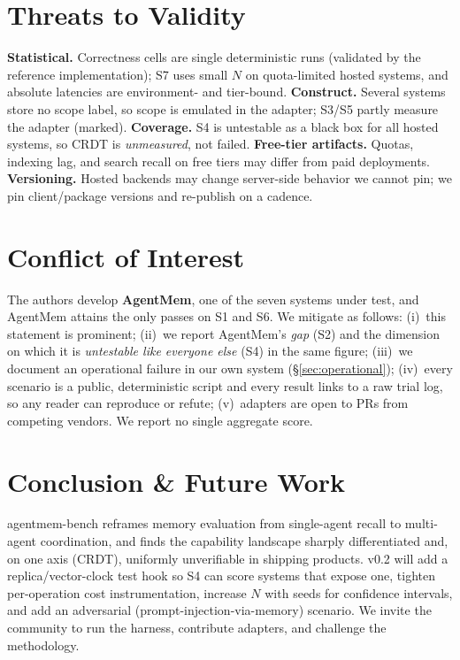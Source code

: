 \documentclass[11pt]{article}
\begin{document}
\section{Threats to Validity}
\textbf{Statistical.} Correctness cells are single deterministic runs (validated by
the reference implementation); S7 uses small $N$ on quota-limited hosted systems, and
absolute latencies are environment- and tier-bound. \textbf{Construct.} Several
systems store no scope label, so scope is emulated in the adapter; S3/S5 partly
measure the adapter (marked). \textbf{Coverage.} S4 is untestable as a black box for
all hosted systems, so CRDT is \emph{unmeasured}, not failed. \textbf{Free-tier
artifacts.} Quotas, indexing lag, and search recall on free tiers may differ from paid
deployments. \textbf{Versioning.} Hosted backends may change server-side behavior we
cannot pin; we pin client/package versions and re-publish on a cadence.

\section{Conflict of Interest}\label{sec:coi}
The authors develop \textbf{AgentMem}, one of the seven systems under test, and
AgentMem attains the only passes on S1 and S6. We mitigate as follows: (i)~this
statement is prominent; (ii)~we report AgentMem's \emph{gap} (S2) and the dimension on
which it is \emph{untestable like everyone else} (S4) in the same figure; (iii)~we
document an operational failure in our own system (\S\ref{sec:operational}); (iv)~every
scenario is a public, deterministic script and every result links to a raw trial log,
so any reader can reproduce or refute; (v)~adapters are open to PRs from competing
vendors. We report no single aggregate score.

\section{Conclusion \& Future Work}
agentmem-bench reframes memory evaluation from single-agent recall to multi-agent
coordination, and finds the capability landscape sharply differentiated and, on one
axis (CRDT), uniformly unverifiable in shipping products. v0.2 will add a
replica/vector-clock test hook so S4 can score systems that expose one, tighten
per-operation cost instrumentation, increase $N$ with seeds for confidence intervals,
and add an adversarial (prompt-injection-via-memory) scenario. We invite the community
to run the harness, contribute adapters, and challenge the methodology.



\end{document}

